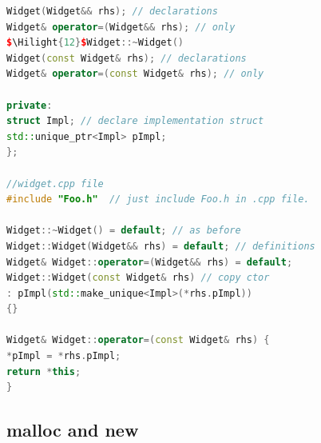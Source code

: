 \documentclass[a4paper,12pt,twoside]{book}
\newcommand{\Hilight}[1]{\makebox[0pt][l]{\color{yellow}\rule[-3pt]{#1em}{11pt}}}
\begin{document}
\begin{itemize}
\begin{enumerate}
\begin{lstlisting}[frame=single, language=c++, mathescape=true]
Widget(Widget&& rhs); // declarations
Widget& operator=(Widget&& rhs); // only
$\Hilight{12}$Widget::~Widget()
Widget(const Widget& rhs); // declarations
Widget& operator=(const Widget& rhs); // only

private:
struct Impl; // declare implementation struct
std::unique_ptr<Impl> pImpl;
};

//widget.cpp file
#include "Foo.h"  // just include Foo.h in .cpp file.

Widget::~Widget() = default; // as before
Widget::Widget(Widget&& rhs) = default; // definitions
Widget& Widget::operator=(Widget&& rhs) = default;
Widget::Widget(const Widget& rhs) // copy ctor
: pImpl(std::make_unique<Impl>(*rhs.pImpl))
{}

Widget& Widget::operator=(const Widget& rhs) {
*pImpl = *rhs.pImpl;
return *this;
}
\end{lstlisting}

\end{enumerate}

\end{itemize}

\subsection{malloc and new}
\end{document}
